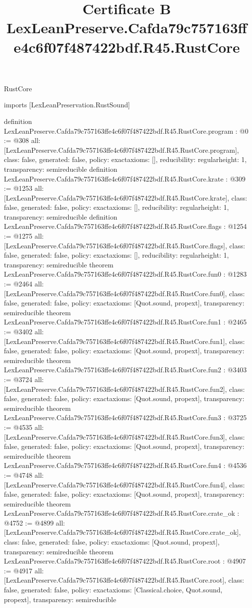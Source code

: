 \begin{lexlean}{RustCore}
\title{Certificate B LexLeanPreserve.Cafda79c757163ffe4c6f07f487422bdf.R45.RustCore}
\begin{coremodule}
imports [LexLeanPreservation.RustSound]

definition LexLeanPreserve.Cafda79c757163ffe4c6f07f487422bdf.R45.RustCore.program : @0 := @308 {
  all: [LexLeanPreserve.Cafda79c757163ffe4c6f07f487422bdf.R45.RustCore.program],
  class: false,
  generated: false,
  policy: exact{axioms: []},
  reducibility: regular{height: 1},
  transparency: semireducible
}
definition LexLeanPreserve.Cafda79c757163ffe4c6f07f487422bdf.R45.RustCore.krate : @309 := @1253 {
  all: [LexLeanPreserve.Cafda79c757163ffe4c6f07f487422bdf.R45.RustCore.krate],
  class: false,
  generated: false,
  policy: exact{axioms: []},
  reducibility: regular{height: 1},
  transparency: semireducible
}
definition LexLeanPreserve.Cafda79c757163ffe4c6f07f487422bdf.R45.RustCore.flags : @1254 := @1275 {
  all: [LexLeanPreserve.Cafda79c757163ffe4c6f07f487422bdf.R45.RustCore.flags],
  class: false,
  generated: false,
  policy: exact{axioms: []},
  reducibility: regular{height: 1},
  transparency: semireducible
}
theorem LexLeanPreserve.Cafda79c757163ffe4c6f07f487422bdf.R45.RustCore.fun0 : @1283 := @2464 {
  all: [LexLeanPreserve.Cafda79c757163ffe4c6f07f487422bdf.R45.RustCore.fun0],
  class: false,
  generated: false,
  policy: exact{axioms: [Quot.sound, propext]},
  transparency: semireducible
}
theorem LexLeanPreserve.Cafda79c757163ffe4c6f07f487422bdf.R45.RustCore.fun1 : @2465 := @3402 {
  all: [LexLeanPreserve.Cafda79c757163ffe4c6f07f487422bdf.R45.RustCore.fun1],
  class: false,
  generated: false,
  policy: exact{axioms: [Quot.sound, propext]},
  transparency: semireducible
}
theorem LexLeanPreserve.Cafda79c757163ffe4c6f07f487422bdf.R45.RustCore.fun2 : @3403 := @3724 {
  all: [LexLeanPreserve.Cafda79c757163ffe4c6f07f487422bdf.R45.RustCore.fun2],
  class: false,
  generated: false,
  policy: exact{axioms: [Quot.sound, propext]},
  transparency: semireducible
}
theorem LexLeanPreserve.Cafda79c757163ffe4c6f07f487422bdf.R45.RustCore.fun3 : @3725 := @4535 {
  all: [LexLeanPreserve.Cafda79c757163ffe4c6f07f487422bdf.R45.RustCore.fun3],
  class: false,
  generated: false,
  policy: exact{axioms: [Quot.sound, propext]},
  transparency: semireducible
}
theorem LexLeanPreserve.Cafda79c757163ffe4c6f07f487422bdf.R45.RustCore.fun4 : @4536 := @4748 {
  all: [LexLeanPreserve.Cafda79c757163ffe4c6f07f487422bdf.R45.RustCore.fun4],
  class: false,
  generated: false,
  policy: exact{axioms: [Quot.sound, propext]},
  transparency: semireducible
}
theorem LexLeanPreserve.Cafda79c757163ffe4c6f07f487422bdf.R45.RustCore.crate_ok : @4752 := @4899 {
  all: [LexLeanPreserve.Cafda79c757163ffe4c6f07f487422bdf.R45.RustCore.crate_ok],
  class: false,
  generated: false,
  policy: exact{axioms: [Quot.sound, propext]},
  transparency: semireducible
}
theorem LexLeanPreserve.Cafda79c757163ffe4c6f07f487422bdf.R45.RustCore.root : @4907 := @4917 {
  all: [LexLeanPreserve.Cafda79c757163ffe4c6f07f487422bdf.R45.RustCore.root],
  class: false,
  generated: false,
  policy: exact{axioms: [Classical.choice, Quot.sound, propext]},
  transparency: semireducible
}


\end{coremodule}
\end{lexlean}
